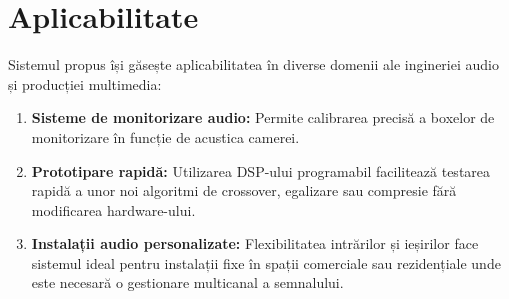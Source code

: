 \section*{Aplicabilitate}

Sistemul propus își găsește aplicabilitatea în diverse domenii ale ingineriei audio și producției multimedia:
\begin{enumerate}
    \item \textbf{Sisteme de monitorizare audio:} Permite calibrarea precisă a boxelor de monitorizare în funcție de acustica camerei.
    \item \textbf{Prototipare rapidă:} Utilizarea DSP-ului programabil facilitează testarea rapidă a unor noi algoritmi de crossover, egalizare sau compresie fără modificarea hardware-ului.
    \item \textbf{Instalații audio personalizate:} Flexibilitatea intrărilor și ieșirilor face sistemul ideal pentru instalații fixe în spații comerciale sau rezidențiale unde este necesară o gestionare multicanal a semnalului.
\end{enumerate}

